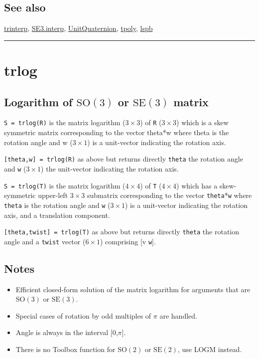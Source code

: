 \subsection*{See also}


\hyperlink{trinterp}{\color{blue} trinterp}, \hyperlink{SE3.interp}{\color{blue} SE3.interp}, \hyperlink{UnitQuaternion}{\color{blue} UnitQuaternion}, \hyperlink{tpoly}{\color{blue} tpoly}, \hyperlink{lspb}{\color{blue} lspb}

\vspace{1.5ex}\rule{\textwidth}{1mm}

\hypertarget{trlog}{\section*{trlog}}
\subsection*{Logarithm of $\mbox{SO}(3)$ or $\mbox{SE}(3)$ matrix}


\texttt{S = trlog(R)} is the matrix logarithm ($3 \times 3$) of \texttt{R} ($3 \times 3$) which is a skew
symmetric matrix corresponding to the vector theta*w where theta is the
rotation angle and w ($3 \times 1$) is a unit-vector indicating the rotation axis.



\texttt{[theta,w] = trlog(R)} as above but returns directly \texttt{theta} the rotation
angle and \texttt{w} ($3 \times 1$) the unit-vector indicating the rotation axis.



\texttt{S = trlog(T)} is the matrix logarithm ($4 \times 4$) of \texttt{T} ($4 \times 4$) which has a
skew-symmetric upper-left $3 \times 3$ submatrix corresponding to the vector
\texttt{theta}*\texttt{w} where \texttt{theta} is the rotation angle and \texttt{w} ($3 \times 1$) is a unit-vector
indicating the rotation axis, and a translation component.



\texttt{[theta,twist] = trlog(T)} as above but returns directly \texttt{theta} the rotation
angle and a \texttt{twist} vector ($6 \times 1$) comprising [v \texttt{w}].


\subsection*{Notes}
\begin{itemize}
  \item Efficient closed-form solution of the matrix logarithm for arguments that are    $\mbox{SO}(3)$ or $\mbox{SE}(3)$.
  \item Special cases of rotation by odd multiples of $\pi$ are handled.
  \item Angle is always in the interval [0,$\pi$].
  \item There is no Toolbox function for $\mbox{SO}(2)$ or $\mbox{SE}(2)$, use LOGM instead.
\end{itemize}

